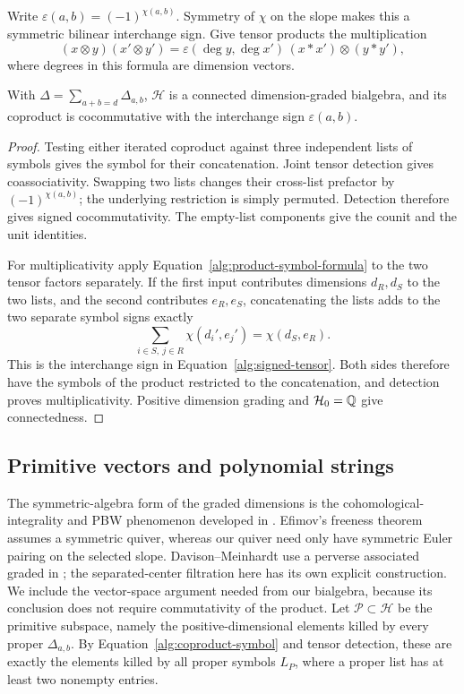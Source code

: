 Write $\varepsilon(a,b)=(-1)^{\chi(a,b)}$.  Symmetry of $\chi$ on
the slope makes this a symmetric bilinear interchange sign.  Give
tensor products the multiplication
\begin{equation}\label{alg:signed-tensor}
 (x\otimes y)(x'\otimes y')
       =\varepsilon(\deg y,\deg x')\,(x*x')\otimes(y*y'),
\end{equation}
where degrees in this formula are dimension vectors.

\begin{proposition}\label{alg:bialgebra}
With $\Delta=\sum_{a+b=d}\Delta_{a,b}$,
$\mathcal H$ is a connected dimension-graded bialgebra, and its
coproduct is cocommutative with the interchange sign
$\varepsilon(a,b)$.
\end{proposition}

\begin{proof}
Testing either iterated coproduct against three independent lists of
symbols gives the symbol for their concatenation.  Joint tensor
detection gives coassociativity.  Swapping two lists changes their
cross-list prefactor by
$(-1)^{\chi(a,b)}$; the underlying restriction is simply permuted.
Detection therefore gives signed cocommutativity.  The empty-list
components give the counit and the unit identities.

For multiplicativity apply
Equation~\eqref{alg:product-symbol-formula} to the two tensor factors
separately.  If the first input contributes dimensions $d_R,d_S$ to
the two lists, and the second contributes $e_R,e_S$, concatenating
the lists adds to the two separate symbol signs exactly
\[
 \sum_{i\in S,\ j\in R}\chi(d_i',e_j')=\chi(d_S,e_R).
\]
This is the interchange sign in
Equation~\eqref{alg:signed-tensor}.  Both sides therefore have the
symbols of the product restricted to the concatenation, and
detection proves multiplicativity.  Positive dimension grading and
$\mathcal H_0=\mathbb Q$ give connectedness.
\end{proof}

\subsection{Primitive vectors and polynomial strings}

The symmetric-algebra form of the graded dimensions is the
cohomological-integrality and PBW phenomenon developed in
\cite{KS11,Ef12,DMe20}.  Efimov's freeness theorem assumes a symmetric
quiver, whereas our quiver need only have symmetric Euler pairing on
the selected slope.  Davison--Meinhardt use a perverse associated
graded in \cite[Theorem~C]{DMe20}; the separated-center filtration here
has its own explicit construction.  We include the vector-space
argument needed from our bialgebra, because its conclusion does not
require commutativity of the product.
Let $\mathcal P\subset\mathcal H$ be the primitive subspace, namely
the positive-dimensional elements killed by every proper
$\Delta_{a,b}$.  By Equation~\eqref{alg:coproduct-symbol} and tensor
detection, these are exactly the elements killed by all proper
symbols $L_P$, where a proper list has at least two nonempty entries.

